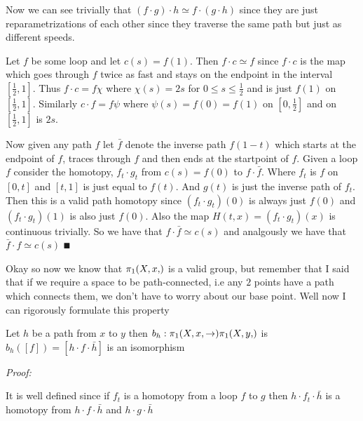 \documentclass[paper=a4,fontsize=paper,12.5pt]{book}
\newcommand{\3}{\vspace*{3mm}}
\newcommand{\Proof}{\textit{Proof:}}
\newcommand{\Fund}[2]{{\pi}_{1}(#1,#2)}
\begin{document}
\3

Now we can see trivially that $(f \cdot g) \cdot h \simeq f \cdot (g \cdot h)$ since they are just reparametrizations of each other since they traverse the same path but just as different speeds. 

\3

Let $f$ be some loop and let $c(s) = f(1)$. Then $f \cdot c \simeq f$ since $f\cdot c$ is the map which goes through $f$ twice as fast and stays on the endpoint in the interval $[\frac{1}{2},1]$. Thus $f \cdot c = f\chi$ where $\chi(s) = 2s$ for $0 \leq s \leq \frac{1}{2}$ and is just $f(1)$ on $[\frac{1}{2},1]$. Similarly $c \cdot f = f\psi$ where $\psi(s) = f(0) = f(1)$ on $[0,\frac{1}{2}]$ and on $[\frac{1}{2},1]$ is $2s$.

\3

Now given any path $f$ let $\bar{f}$ denote the inverse path $f(1-t)$ which starts at the endpoint of $f$, traces through $f$ and then ends at the startpoint of $f$. Given a loop $f$ consider the homotopy, ${f}_{t} \cdot {g}_{t}$ from $c(s) = f(0)$ to $f \cdot \bar{f}$. Where ${f}_{t}$ is $f$ on $[0,t]$ and $[t,1]$ is just equal to $f(t)$. And $g(t)$ is just the inverse path of ${f}_{t}$. Then this is a valid path homotopy since $({f}_{t} \cdot {g}_{t})(0)$ is always just $f(0)$ and $({f}_{t} \cdot {g}_{t})(1)$ is also just $f(0)$. Also the map $H(t,x) = ({f}_{t} \cdot {g}_{t})(x)$ is continuous trivially. So we have that $f \cdot \bar{f} \simeq c(s)$ and analgously we have that $\bar{f} \cdot f \simeq c(s)$ $\QED$

\3

Okay so now we know that $\Fund{X,x}$ is a valid group, but remember that I said that if we require a space to be path-connected, i.e any $2$ points have a path which connects them, we don't have to worry about our base point. Well now I can rigorously formulate this property

\3

\begin{lemma}

Let $h$ be a path from $x$ to $y$ then ${b}_{h}: \Fund{X,x} \to \Fund{X,y}$ is ${b}_{h}([f]) = [h \cdot f \cdot \bar{h}]$ is an isomorphism 


\end{lemma}

\Proof

It is well defined since if ${f}_{t}$ is a homotopy from a loop $f$ to $g$ then $h \cdot {f}_{t} \cdot \bar{h}$ is a homotopy from $h \cdot f \cdot \bar{h}$ and $h \cdot g \cdot \bar{h}$
\end{document}
